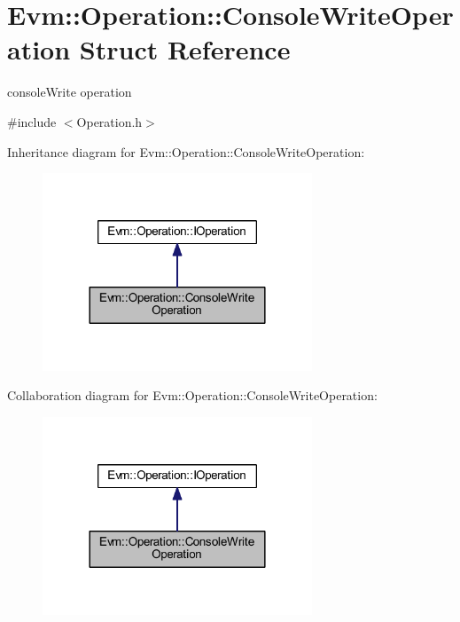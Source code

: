 \hypertarget{struct_evm_1_1_operation_1_1_console_write_operation}{}\section{Evm\+:\+:Operation\+:\+:Console\+Write\+Operation Struct Reference}
\label{struct_evm_1_1_operation_1_1_console_write_operation}


console\+Write operation  




{\ttfamily \#include $<$Operation.\+h$>$}



Inheritance diagram for Evm\+:\+:Operation\+:\+:Console\+Write\+Operation\+:
\nopagebreak
\begin{figure}[H]
\begin{center}
\leavevmode
\includegraphics[width=228pt]{struct_evm_1_1_operation_1_1_console_write_operation__inherit__graph}
\end{center}
\end{figure}


Collaboration diagram for Evm\+:\+:Operation\+:\+:Console\+Write\+Operation\+:
\nopagebreak
\begin{figure}[H]
\begin{center}
\leavevmode
\includegraphics[width=228pt]{struct_evm_1_1_operation_1_1_console_write_operation__coll__graph}
\end{center}
\end{figure}
